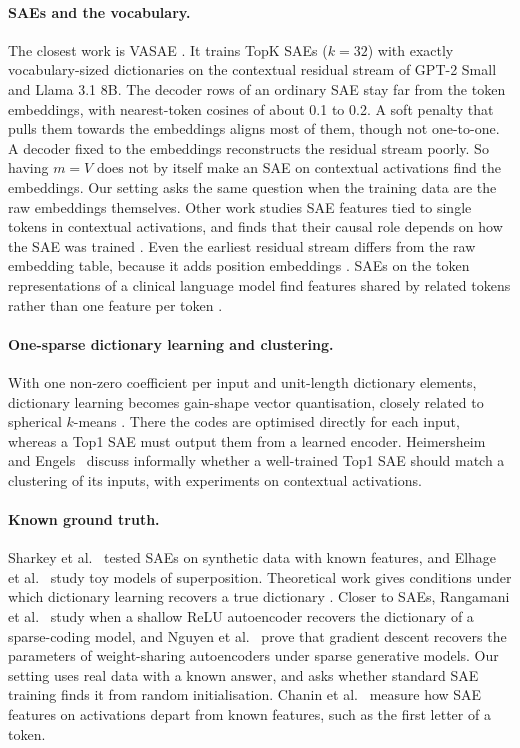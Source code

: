 \documentclass[11pt]{article}
\begin{document}
\paragraph{SAEs and the vocabulary.} The closest work is VASAE \cite{zhang2026vasae}. It trains TopK SAEs ($k = 32$) with exactly vocabulary-sized dictionaries on the contextual residual stream of GPT-2 Small and Llama 3.1 8B. The decoder rows of an ordinary SAE stay far from the token embeddings, with nearest-token cosines of about 0.1 to 0.2. A soft penalty that pulls them towards the embeddings aligns most of them, though not one-to-one. A decoder fixed to the embeddings reconstructs the residual stream poorly. So having $m = V$ does not by itself make an SAE on contextual activations find the embeddings. Our setting asks the same question when the training data are the raw embeddings themselves. Other work studies SAE features tied to single tokens in contextual activations, and finds that their causal role depends on how the SAE was trained \cite{cho2026singletoken}. Even the earliest residual stream differs from the raw embedding table, because it adds position embeddings \cite{chughtai2024positional}. SAEs on the token representations of a clinical language model find features shared by related tokens rather than one feature per token \cite{wu2024beyond}.

\paragraph{One-sparse dictionary learning and clustering.} With one non-zero coefficient per input and unit-length dictionary elements, dictionary learning becomes gain-shape vector quantisation, closely related to spherical $k$-means \cite{coates2012kmeans}. There the codes are optimised directly for each input, whereas a Top1 SAE must output them from a learned encoder. Heimersheim and Engels~\cite{heimersheim2024shortform} discuss informally whether a well-trained Top1 SAE should match a clustering of its inputs, with experiments on contextual activations.

\paragraph{Known ground truth.} Sharkey et al.~\cite{sharkey2022taking} tested SAEs on synthetic data with known features, and Elhage et al.~\cite{elhage2022toy} study toy models of superposition. Theoretical work gives conditions under which dictionary learning recovers a true dictionary \cite{spielman2012exact,arora2014new}. Closer to SAEs, Rangamani et al.~\cite{rangamani2017sparse} study when a shallow ReLU autoencoder recovers the dictionary of a sparse-coding model, and Nguyen et al.~\cite{nguyen2019dynamics} prove that gradient descent recovers the parameters of weight-sharing autoencoders under sparse generative models. Our setting uses real data with a known answer, and asks whether standard SAE training finds it from random initialisation. Chanin et al.~\cite{chanin2024absorption} measure how SAE features on activations depart from known features, such as the first letter of a token.
\end{document}
